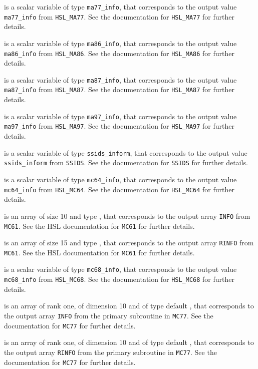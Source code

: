 \documentclass{galahad}
\begin{document}
\begin{description}
 is a scalar variable of type {\tt ma77\_info},
that corresponds to the output value {\tt ma77\_info}
from {\tt HSL\_MA77}. See the documentation for {\tt HSL\_MA77} for further
details.

 is a scalar variable of type {\tt ma86\_info},
that corresponds to the output value {\tt ma86\_info}
from {\tt HSL\_MA86}. See the documentation for {\tt HSL\_MA86} for further
details.

 is a scalar variable of type {\tt ma87\_info},
that corresponds to the output value {\tt ma87\_info}
from {\tt HSL\_MA87}. See the documentation for {\tt HSL\_MA87} for further
details.

 is a scalar variable of type {\tt ma97\_info},
that corresponds to the output value {\tt ma97\_info}
from {\tt HSL\_MA97}. See the documentation for {\tt HSL\_MA97} for further
details.

 is a scalar variable of type {\tt ssids\_inform},
that corresponds to the output value {\tt ssids\_inform}
from {\tt SSIDS}. See the documentation for {\tt SSIDS} for further
details.

 is a scalar variable of type {\tt mc64\_info},
that corresponds to the output value {\tt mc64\_info}
from {\tt HSL\_MC64}. See the documentation for {\tt HSL\_MC64} for further
details.

 is an array of size 10 and type \integer,
that corresponds to the output array {\tt INFO}
from {\tt MC61}. See the HSL documentation for {\tt MC61} for further
details.

 is an array of size 15 and type \realdp,
that corresponds to the output array {\tt RINFO}
from {\tt MC61}. See the HSL documentation for {\tt MC61} for further
details.

 is a scalar variable of type {\tt mc68\_info},
that corresponds to the output value {\tt mc68\_info}
from {\tt HSL\_MC68}. See the documentation for {\tt HSL\_MC68} for further
details.

 is an array of rank one, of dimension 10 and of
type default \integer, that corresponds to the output array {\tt INFO}
from the primary subroutine in {\tt MC77}. See the documentation for
{\tt MC77} for further details.

 is an array of rank one, of dimension 10 and of
type default \realdp, that corresponds to the output array {\tt RINFO}
from the primary subroutine in {\tt MC77}. See the documentation for
{\tt MC77} for further details.


\end{description}
\end{document}
